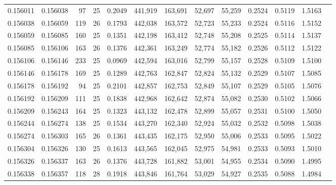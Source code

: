 \begin{tabular}{rrrrrrrrrrrrr}
0.156011 & 0.156038 &  97 &  25 &                                     0.2049 & 441,919 & 163,691 &  52,697 &  55,259 & 0.2524 & 0.5119 & 1.5163 \\
0.156038 & 0.156059 & 119 &  26 &                                     0.1793 & 442,038 & 163,572 &  52,723 &  55,233 & 0.2524 & 0.5116 & 1.5152 \\
0.156059 & 0.156085 & 160 &  25 &                                     0.1351 & 442,198 & 163,412 &  52,748 &  55,208 & 0.2525 & 0.5114 & 1.5137 \\
0.156085 & 0.156106 & 163 &  26 &                                     0.1376 & 442,361 & 163,249 &  52,774 &  55,182 & 0.2526 & 0.5112 & 1.5122 \\
0.156106 & 0.156146 & 233 &  25 &                                     0.0969 & 442,594 & 163,016 &  52,799 &  55,157 & 0.2528 & 0.5109 & 1.5100 \\
0.156146 & 0.156178 & 169 &  25 &                                     0.1289 & 442,763 & 162,847 &  52,824 &  55,132 & 0.2529 & 0.5107 & 1.5085 \\
0.156178 & 0.156192 &  94 &  25 &                                     0.2101 & 442,857 & 162,753 &  52,849 &  55,107 & 0.2529 & 0.5105 & 1.5076 \\
0.156192 & 0.156209 & 111 &  25 &                                     0.1838 & 442,968 & 162,642 &  52,874 &  55,082 & 0.2530 & 0.5102 & 1.5066 \\
0.156209 & 0.156243 & 164 &  25 &                                     0.1323 & 443,132 & 162,478 &  52,899 &  55,057 & 0.2531 & 0.5100 & 1.5050 \\
0.156244 & 0.156274 & 138 &  25 &                                     0.1534 & 443,270 & 162,340 &  52,924 &  55,032 & 0.2532 & 0.5098 & 1.5038 \\
0.156274 & 0.156303 & 165 &  26 &                                     0.1361 & 443,435 & 162,175 &  52,950 &  55,006 & 0.2533 & 0.5095 & 1.5022 \\
0.156304 & 0.156326 & 130 &  25 &                                     0.1613 & 443,565 & 162,045 &  52,975 &  54,981 & 0.2533 & 0.5093 & 1.5010 \\
0.156326 & 0.156337 & 163 &  26 &                                     0.1376 & 443,728 & 161,882 &  53,001 &  54,955 & 0.2534 & 0.5090 & 1.4995 \\
0.156338 & 0.156357 & 118 &  28 &                                     0.1918 & 443,846 & 161,764 &  53,029 &  54,927 & 0.2535 & 0.5088 & 1.4984 \\

\end{tabular}
